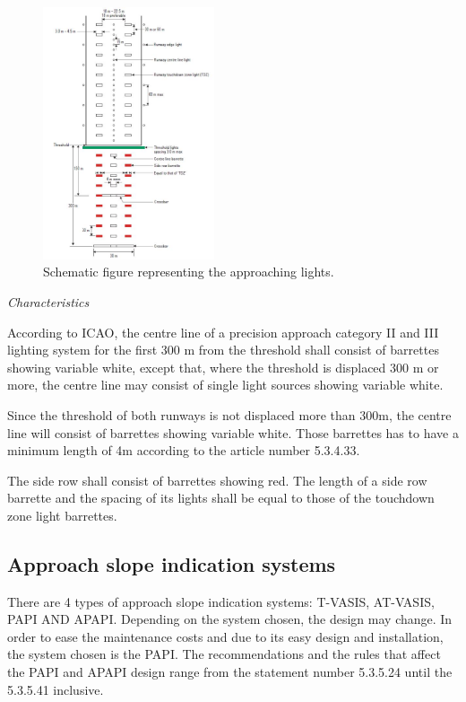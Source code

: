 		\begin{figure}[H]
			\centering
			\includegraphics[clip, trim=0cm 0cm 0cm 0cm, width=0.45\textwidth]{./images/Annex14/approachlights}
			\caption{Schematic figure representing the approaching lights.} %
			\label{} %
		\end{figure} 
	
		\textit{Characteristics}
		
		According to ICAO, the centre line of a precision approach category II and III lighting system for the first 300 m from the
		threshold shall consist of barrettes showing variable white, except that, where the threshold is displaced 300 m or more, the
		centre line may consist of single light sources showing variable white. 
		
		Since the threshold of both runways is not displaced more than 300m, the centre line will consist of barrettes showing variable white. Those barrettes has to have a minimum length of 4m according to the article number 5.3.4.33.
		
		The side row shall consist of barrettes showing red. The length of a side row barrette and the spacing of its
		lights shall be equal to those of the touchdown zone light barrettes.
		
		\subsection{Approach slope indication systems}
		There are 4 types of approach slope indication systems: T-VASIS, AT-VASIS, PAPI AND APAPI. Depending on the system chosen, the design may change. In order to ease the maintenance costs and due to its easy design and installation, the system chosen is the PAPI.
		The recommendations and the rules that affect the PAPI and APAPI design range from the statement number 5.3.5.24 until the 5.3.5.41 inclusive.
		
